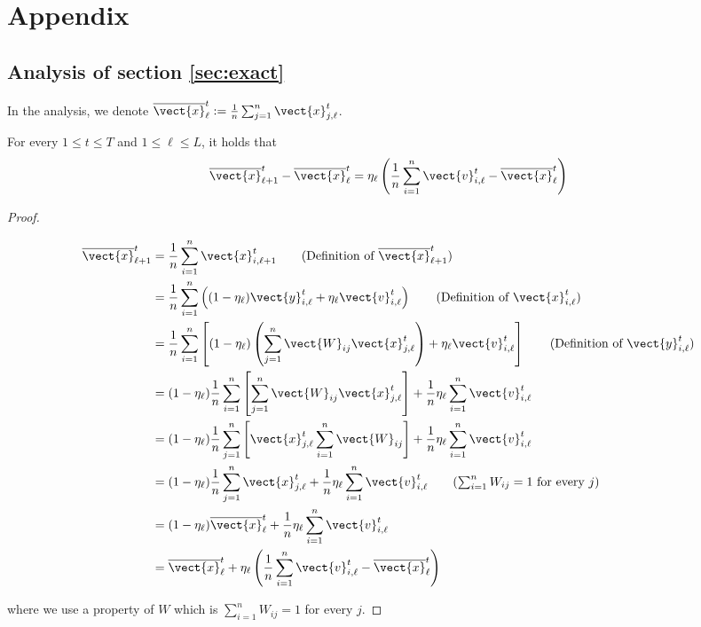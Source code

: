 \section{Appendix}
\appendices
\subsection{Analysis of section \ref{sec:exact}} 
In the analysis, we denote $\overline{\vect{x}}^{t}_{\ell} := \frac{1}{n} \sum_{j=1}^{n} \vect{x}^{t}_{j,\ell}$.

\begin{lemma}\label{lmm:avg}
For every $1 \leq t \leq T$ and $1 \leq \ell \leq L$, it holds that 
\begin{equation}
  \overline{\vect{x}}^t_{\ell+1} - \overline{\vect{x}}^t_{\ell} = \eta_{\ell} \left( \frac{1}{n}\sum_{i=1}^{n} \vect{v}^t_{i,\ell} - \overline{\vect{x}}^t_{\ell}\right)
\end{equation}
\end{lemma} 

\begin{proof}
\begin{linenomath}
\begin{align*}
\overline{\vect{x}}_{\ell+1}^t 
&= \frac{1}{n} \sum_{i=1}^{n} \vect{x}^{t}_{i,\ell + 1} \tag{Definition of $\overline{\vect{x}}_{\ell+1}^t$}
\\
&= \frac{1}{n} \sum_{i=1}^{n} \left ((1-\eta_{\ell}) \vect{y}^{t}_{i,\ell} + \eta_{\ell} \vect{v}_{i,\ell}^t \right )  \tag{Definition of $\vect{x}_{i,\ell}^t$} 
\\
&= \frac{1}{n} \sum_{i=1}^{n} \left [ (1-\eta_{\ell}) \left ( \sum_{j=1}^n \vect{W}_{ij} \vect{x}_{j,\ell}^t  \right ) + \eta_{\ell} \vect{v}_{i,\ell}^t \right ] \tag{Definition of $\vect{y}_{i,\ell}^t$}
\\
&= (1 - \eta_{\ell}) \frac{1}{n} \sum_{i=1}^n \left [ \sum_{j=1}^n \vect{W}_{ij}\vect{x}_{j,\ell}^t \right ] + \frac{1}{n}\eta_{\ell} \sum_{i=1}^n \vect{v}_{i,\ell}^t
\\
&= (1 - \eta_{\ell}) \frac{1}{n} \sum_{j=1}^n \left [ \vect{x}_{j,\ell}^t \sum_{i=1}^n \vect{W}_{ij} \right ] + \frac{1}{n} \eta_{\ell} \sum_{i=1}^n \vect{v}_{i,\ell}^t
\\
&= (1 - \eta_{\ell}) \frac{1}{n} \sum_{j=1}^n \vect{x}_{j,\ell}^t + \frac{1}{n} \eta_{\ell} \sum_{i=1}^n \vect{v}_{i,\ell}^t \tag{$\sum_{i=1}^n W_{ij} =1$ for every $j$}
\\
&= (1 - \eta_{\ell}) \overline{\vect{x}}_{\ell}^t + \frac{1}{n} \eta_{\ell} \sum_{i=1}^n \vect{v}_{i,\ell}^t
\\
&= \overline{\vect{x}}_{\ell}^t + \eta_{\ell} \left ( \frac{1}{n} \sum_{i=1}^n \vect{v}_{i,\ell}^t - \overline{\vect{x}}_{\ell}^t \right )
\end{align*}
\end{linenomath}
where we use a property of $W$ which is $\sum_{i = 1}^{n} W_{ij} = 1$ for every $j$.
\end{proof}

